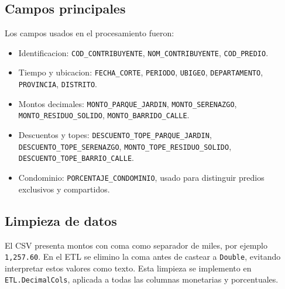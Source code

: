 \subsection{Campos principales}

Los campos usados en el procesamiento fueron:

\begin{itemize}
    \item Identificacion: \texttt{COD\_CONTRIBUYENTE}, \texttt{NOM\_CONTRIBUYENTE}, \texttt{COD\_PREDIO}.
    \item Tiempo y ubicacion: \texttt{FECHA\_CORTE}, \texttt{PERIODO}, \texttt{UBIGEO}, \texttt{DEPARTAMENTO}, \texttt{PROVINCIA}, \texttt{DISTRITO}.
    \item Montos decimales: \texttt{MONTO\_PARQUE\_JARDIN}, \texttt{MONTO\_SERENAZGO}, \texttt{MONTO\_RESIDUO\_SOLIDO}, \texttt{MONTO\_BARRIDO\_CALLE}.
    \item Descuentos y topes: \texttt{DESCUENTO\_TOPE\_PARQUE\_JARDIN}, \texttt{DESCUENTO\_TOPE\_SERENAZGO}, \texttt{MONTO\_TOPE\_RESIDUO\_SOLIDO}, \texttt{DESCUENTO\_TOPE\_BARRIO\_CALLE}.
    \item Condominio: \texttt{PORCENTAJE\_CONDOMINIO}, usado para distinguir predios exclusivos y compartidos.
\end{itemize}

\subsection{Limpieza de datos}

El CSV presenta montos con coma como separador de miles, por ejemplo \texttt{1,257.60}. En el ETL se elimino la coma antes de castear a \texttt{Double}, evitando interpretar estos valores como texto. Esta limpieza se implemento en \texttt{ETL.DecimalCols}, aplicada a todas las columnas monetarias y porcentuales.
